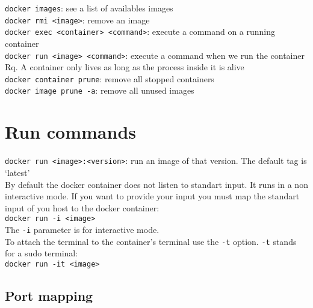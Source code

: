 \documentclass[french]{article}
\begin{document}
\verb|docker images|: see a list of availables images\\

\verb|docker rmi <image>|: remove an image\\

\verb|docker exec <container> <command>|: execute a command on a running container\\

\verb|docker run <image> <command>|: execute a command when we run the container\\


Rq. A container only lives as long as the process inside it is alive\\

\verb|docker container prune|: remove all stopped containers\\

\verb|docker image prune -a|: remove all unused images\\

\section{Run commands}

\verb|docker run <image>:<version>|: run an image of that version. The default tag is `latest'\\

By default the docker container does not listen to standart input. It runs in a non interactive mode. If you want to provide your input you must map the standart input of you host to the docker container:\\

\verb|docker run -i <image>|\\

The \verb|-i| parameter is for interactive mode.\\
To attach the terminal to the container's terminal use the \verb|-t| option.  \verb|-t| stands for a sudo terminal:\\

\verb|docker run -it <image>|\\

\subsection{Port mapping}
\end{document}
